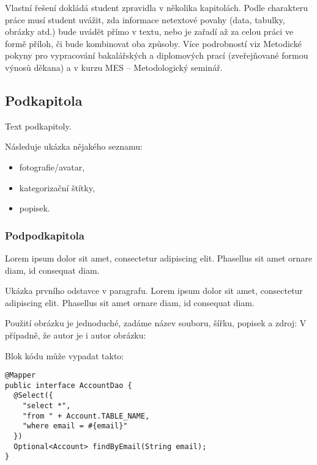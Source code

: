
Vlastní řešení dokládá student zpravidla v několika kapitolách.
Podle charakteru práce musí student uvážit, zda informace
netextové povahy (data, tabulky, obrázky atd.) bude uvádět přímo v textu, nebo je zařadí až za celou práci ve formě příloh, či bude kombinovat oba způsoby.
Více podrobností viz Metodické pokyny pro vypracování bakalářských a diplomových prací (zveřejňované formou výnosů děkana)
a v kurzu MES – Metodologický seminář.

	\subsection{Podkapitola}

	Text podkapitoly.

	Následuje ukázka nějakého seznamu:
	\begin{itemize}
		\item fotografie/avatar,
		\item kategorizační štítky,
		\item popisek.
	\end{itemize}

		\subsubsection{Podpodkapitola}

		Lorem ipsum dolor sit amet, consectetur adipiscing elit. Phasellus sit amet ornare diam, id consequat diam.


			\noindent Ukázka prvního odstavce v paragrafu. Lorem ipsum dolor sit amet, consectetur adipiscing elit. Phasellus sit amet ornare diam, id consequat diam.



			Použití obrázku je jednoduché, zadáme název souboru, šířku, popisek a zdroj:
			V případně, že autor je i autor obrázku:


			Blok kódu může vypadat takto:

			\begin{codeblock}
				\begin{verbatim}
@Mapper
public interface AccountDao {
  @Select({
    "select *",
    "from " + Account.TABLE_NAME,
    "where email = #{email}"
  })
  Optional<Account> findByEmail(String email);
}
				\end{verbatim}
			\end{codeblock}

